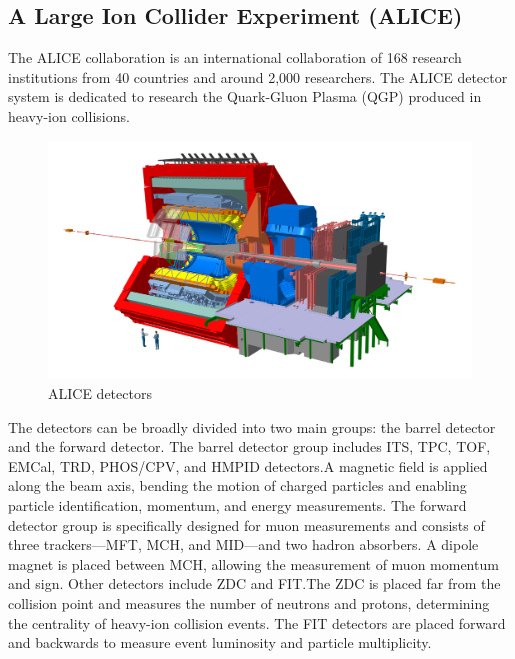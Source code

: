         \subsection{A Large Ion Collider Experiment (ALICE)}
        The ALICE collaboration is an international collaboration of 168 research institutions from 40 countries and around 2,000 researchers. The ALICE detector system is dedicated to research the Quark-Gluon Plasma (QGP) produced in heavy-ion collisions.
        \begin{figure}[htbp]
            \centering
            \includegraphics[keepaspectratio, scale=0.2]{fig/2_1_ALICE_RUN3_detectors.jpg}
            \caption{ALICE detectors}
            \label{ALICE_detectors}
        \end{figure}
        The detectors can be broadly divided into two main groups: the barrel detector and the forward detector.
        The barrel detector group includes ITS, TPC, TOF, EMCal, TRD, PHOS/CPV, and HMPID detectors.\@ A magnetic field is applied along the beam axis, bending the motion of charged particles and enabling particle identification, momentum, and energy measurements. The forward detector group is specifically designed for muon measurements and consists of three trackers—MFT, MCH, and MID—and two hadron absorbers. A dipole magnet is placed between MCH, allowing the measurement of muon momentum and sign. Other detectors include ZDC and FIT.\@ The ZDC is placed far from the collision point and measures the number of neutrons and protons, determining the centrality of heavy-ion collision events. The FIT detectors are placed forward and backwards to measure event luminosity and particle multiplicity.

